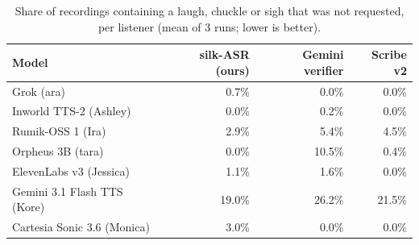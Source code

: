 \begin{table}[t]\centering\small
\begin{tabular}{l|rrr}
\toprule
Model & silk-ASR (ours) & Gemini verifier & Scribe v2 \\
\midrule
Grok (ara) & 0.7\% & 0.0\% & 0.0\% \\
Inworld TTS-2 (Ashley) & 0.0\% & 0.2\% & 0.0\% \\
Rumik-OSS 1 (Ira) & 2.9\% & 5.4\% & 4.5\% \\
Orpheus 3B (tara) & 0.0\% & 10.5\% & 0.4\% \\
ElevenLabs v3 (Jessica) & 1.1\% & 1.6\% & 0.0\% \\
Gemini 3.1 Flash TTS (Kore) & 19.0\% & 26.2\% & 21.5\% \\
Cartesia Sonic 3.6 (Monica) & 3.0\% & 0.0\% & 0.0\% \\
\bottomrule
\end{tabular}
\caption{Share of recordings containing a laugh, chuckle or sigh that was not requested, per listener (mean of 3 runs; lower is better).}
\label{tab:nova_unrequested}
\end{table}
